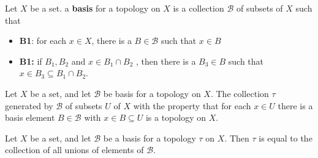 \documentclass{article}
\theoremstyle{remark}
\begin{document}
\begin{definition}[Basis]
    Let $X$ be a set. a \textbf{basis} for a topology on $X$ is a collection $ \mathscr{B} $ of subsets of $X$ such
    that
    \begin{itemize}
        \item \textbf{B1}: for each $x \in X$, there is a $B \in  \mathscr{B} $ such that $x \in B$
        \item \textbf{B1:} if $B_{1}, B_{2}$ and $x \in B_{1} \cap B_{2}$ , then there is a $B_{3} \in  B$ such that $x
            \in  B_{3} \subseteq B_{1} \cap B_{2}$.
    \end{itemize}


\end{definition}






\begin{theorem}
Let $X$ be a set, and let $ \mathscr{B} $ be basis for a topology on $X$. The collection  $\tau $ generated by $
\mathscr{B} $ of subsets $U$ of  $X$ with the property that for each $x \in U$ there is a basis element $B \in
\mathscr{B} $ with $ x \in B \subseteq U$ is a topology on $X$.
\end{theorem}

\begin{theorem}
Let $X$ be a set, and let $\mathscr{B} $ be a basis for a topology $\tau $ on $X$. Then  $\tau $ is equal to the
collection of all unions of elements of $ \mathscr{B} $.
\end{theorem}
\end{document}
